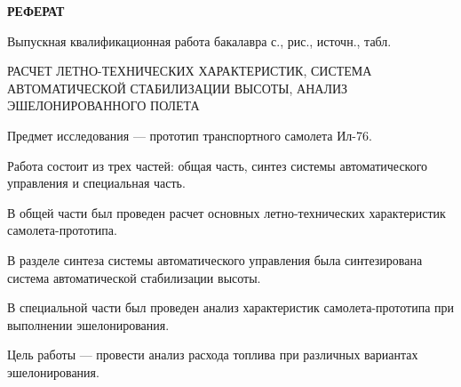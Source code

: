 \begin{center}
\textbf{\large РЕФЕРАТ}
\end{center}

Выпускная квалификационная работа бакалавра \pageref{LastPage} с.,
 рис.,  источн.,
 табл. 

РАСЧЕТ ЛЕТНО-ТЕХНИЧЕСКИХ ХАРАКТЕРИСТИК, СИСТЕМА АВТОМАТИЧЕСКОЙ СТАБИЛИЗАЦИИ
ВЫСОТЫ, АНАЛИЗ ЭШЕЛОНИРОВАННОГО ПОЛЕТА 

Предмет исследования --- прототип транспортного самолета Ил-76.

Работа состоит из трех частей: общая часть, синтез системы автоматического
управления и специальная часть.

В общей части был проведен расчет основных летно-технических характеристик
самолета-прототипа.

В разделе синтеза системы автоматического управления была синтезирована система
автоматической стабилизации высоты.

В специальной части был проведен анализ характеристик самолета-прототипа при
выполнении эшелонирования.

Цель работы --- провести анализ расхода топлива при различных вариантах
эшелонирования.
 
